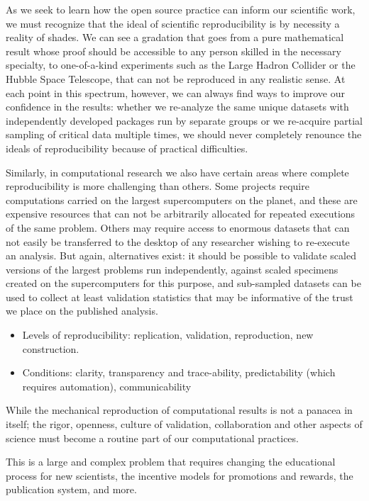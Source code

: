 \documentclass[ChapterTOCs,krantz2]{krantz} %
\begin{document}
As we seek to learn how the open source practice can inform our scientific
work, we must recognize that the ideal of scientific reproducibility
is by necessity a reality of shades. We can see a gradation that goes
from a pure mathematical result whose proof should be accessible to
any person skilled in the necessary specialty, to one-of-a-kind experiments
such as the Large Hadron Collider or the Hubble Space Telescope, that
can not be reproduced in any realistic sense. At each point in this
spectrum, however, we can always find ways to improve our confidence
in the results: whether we re-analyze the same unique datasets with
independently developed packages run by separate groups or we re-acquire
partial sampling of critical data multiple times, we should never
completely renounce the ideals of reproducibility because of practical
difficulties.

Similarly, in computational research we also have certain areas where
complete reproducibility is more challenging than others. Some projects
require computations carried on the largest supercomputers on the
planet, and these are expensive resources that can not be arbitrarily
allocated for repeated executions of the same problem. Others may
require access to enormous datasets that can not easily be transferred
to the desktop of any researcher wishing to re-execute an analysis.
But again, alternatives exist: it should be possible to validate scaled
versions of the largest problems run independently, against scaled
specimens created on the supercomputers for this purpose, and
sub-sampled datasets can be used to collect at least validation statistics
that may be informative of the trust we place on the published analysis.

\begin{itemize}
\item Levels of reproducibility: replication, validation, reproduction,
new construction.
\item Conditions: clarity, transparency and trace-ability, predictability
(which requires automation), communicability
\end{itemize}

While the mechanical reproduction of computational results is not a
panacea in itself; the rigor, openness, culture of validation, collaboration and
other aspects of science must become a routine part of our computational practices.

This is a large and complex problem that requires changing the educational
process for new scientists, the incentive models for promotions and
rewards, the publication system, and more.
\end{document}
